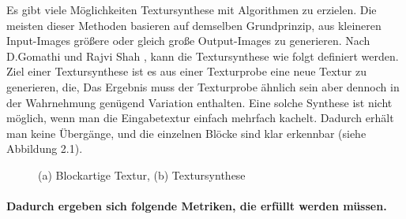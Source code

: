 \documentclass[12pt, a4paper,twoside,openany]{report} %
\begin{document}
Es gibt viele Möglichkeiten Textursynthese mit Algorithmen zu erzielen.
Die meisten dieser Methoden basieren auf demselben Grundprinzip, aus kleineren Input-Images größere oder gleich große Output-Images zu generieren.
Nach D.Gomathi und Rajvi Shah \cite[S.1]{GomathiShah2009}, kann die Textursynthese wie folgt definiert werden.
\newline
Ziel einer Textursynthese ist es aus einer Texturprobe eine neue Textur zu generieren, die, 
Das Ergebnis muss der Texturprobe ähnlich sein aber dennoch in der Wahrnehmung genügend Variation enthalten.
Eine solche Synthese ist nicht möglich, wenn man die Eingabetextur einfach mehrfach kachelt.
Dadurch erhält man keine  Übergänge, und die einzelnen Blöcke sind klar erkennbar {(siehe Abbildung 2.1)}.

\begin{figure}[H]
    \centering
    \qquad
    \caption{(a) Blockartige Textur, (b) Textursynthese}%
\end{figure}

\paragraph{Dadurch ergeben sich folgende Metriken, die erfüllt werden müssen.}
\end{document}
